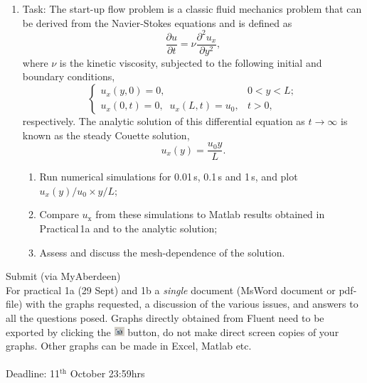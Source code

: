 \documentclass[11pt,a4paper,oneside,hidelinks]{scrartcl}
\begin{document}
\begin{enumerate}
    \item Task: The start-up flow problem is a classic fluid mechanics problem that can be derived from the Navier-Stokes equations and is defined as
       \begin{displaymath}
           \frac{\partial u}{\partial t} = \nu \frac{\partial^{2}u_{x}}{\partial y^{2}},
       \end{displaymath}
       where $\nu$ is the kinetic viscosity, subjected to the following initial and boundary conditions,
       \begin{displaymath}
           \begin{cases}
               u_{x}(y,0) = 0, \;\;\;\;&  0 < y < L; \\
               u_{x}(0,t) = 0, \;\; u_{x}(L,t) = u_{0}, & t>0,
           \end{cases}
       \end{displaymath}
       respectively. The analytic solution of this differential equation as $t\rightarrow\infty$ is known as the steady Couette solution, 
       \begin{displaymath}
           u_{x}(y) = \frac{u_{0}y}{L}.
       \end{displaymath}
\begin{enumerate}
   \item Run numerical simulations for 0.01\,s, 0.1\,s and 1\,s, and plot $u_{x}(y)/u_{0} \times y/L$;
   \item Compare $u_\mathrm{x}$ from these simulations to Matlab results obtained in Practical\,1a and to the analytic solution;
   \item Assess and discuss the mesh-dependence of the solution.
\end{enumerate}
\end{enumerate}





\vspace{2cm}
Submit (via MyAberdeen)\\
For practical 1a (29 Sept) and 1b a \emph{single} document (MsWord document or pdf-file) with the graphs requested, a discussion of the various issues, and answers to all the questions posed. Graphs directly obtained from Fluent need to be exported by clicking the \includegraphics[width=.4cm]{export_fig_icon.png} button, do not make direct screen copies of your graphs. Other graphs can be made in Excel, Matlab etc.
\\
\\
Deadline: 11$^\mathrm{th}$ October 23:59hrs
\end{document}
